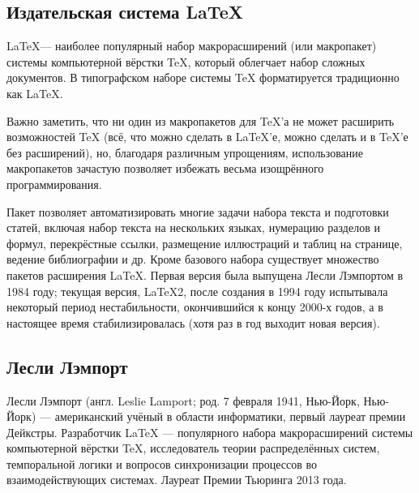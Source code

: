 \documentclass[a4paper,12pt]{article} %
\begin{document}
\subsection{Издательская система LaTeX}
\hspace{15mm}\LaTeX  — наиболее популярный набор макрорасширений (или макропакет) системы компьютерной вёрстки TeX, который облегчает набор сложных документов. В типографском наборе системы TeX форматируется традиционно как \LaTeX.

\hspace{15mm}Важно заметить, что ни один из макропакетов для TeX’а не может расширить возможностей TeX (всё, что можно сделать в LaTeX’е, можно сделать и в TeX’е без расширений), но, благодаря различным упрощениям, использование макропакетов зачастую позволяет избежать весьма изощрённого программирования.

\hspace{15mm}Пакет позволяет автоматизировать многие задачи набора текста и подготовки статей, включая набор текста на нескольких языках, нумерацию разделов и формул, перекрёстные ссылки, размещение иллюстраций и таблиц на странице, ведение библиографии и др. Кроме базового набора существует множество пакетов расширения LaTeX. Первая версия была выпущена Лесли Лэмпортом в 1984 году; текущая версия, LaTeX2, после создания в 1994 году испытывала некоторый период нестабильности, окончившийся к концу 2000-х годов, а в настоящее время стабилизировалась (хотя раз в год выходит новая версия).
\subsection{Лесли Лэмпорт}
\hspace{15mm}Лесли Лэмпорт (англ. Leslie Lamport; род. 7 февраля 1941, Нью-Йорк, Нью-Йорк) — американский учёный в области информатики, первый лауреат премии Дейкстры. Разработчик LaTeX — популярного набора макрорасширений системы компьютерной вёрстки TeX, исследователь теории распределённых систем, темпоральной логики и вопросов синхронизации процессов во взаимодействующих системах. Лауреат Премии Тьюринга 2013 года.
\end{document}
